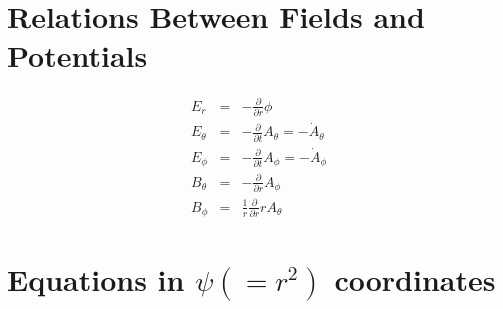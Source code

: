 \documentclass[11pt]{article}
\def\ddt{\frac{\partial}{\partial t}}
\def\ddr{\frac{\partial}{\partial r}}
\def\Er{E_r}
\def\Eth{E_\theta}
\def\Eph{E_\phi}
\def\Bth{B_\theta}
\def\Bph{B_\phi}
\def\Athd{\dot{A}_\theta}
\def\Aphd{\dot{A}_\phi}
\def\Ath{A_\theta}
\def\Aph{A_\phi}
\begin{document}
\bigskip

\section{Relations Between Fields and Potentials}
\setcounter{equation}{0}

\begin{eqnarray}
%
%
  \Er &=&
%
  - \ddr \phi
\\[5mm]
%
%
  \Eth &=&
%
  - \ddt \Ath = - \Athd
\\[5mm]
%
%
  \Eph &=&
%
  - \ddt \Aph = - \Aphd
\\[5mm]
%
%
  \Bth &=&
%
  - \ddr \Aph
\\[5mm]
%
%
  \Bph &=&
%
  \frac{1}{r} \ddr r \Ath
\end{eqnarray}

\bigskip

\section{Equations in $\psi(=r^2)$ coordinates}
\setcounter{equation}{0}
\end{document}
